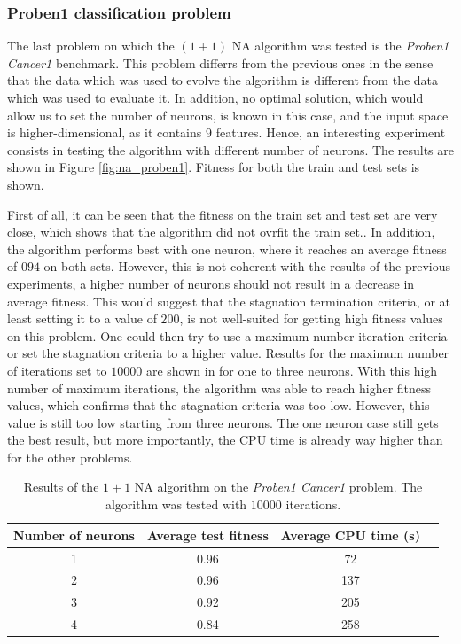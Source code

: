 \subsubsection{Proben1 classification problem}

The last problem on which the $(1 + 1)$ NA algorithm was tested is the \textit{Proben1 Cancer1} benchmark. This problem differrs from the previous ones in the sense that the data which
was used to evolve the algorithm is different from the data which was used to evaluate it. In addition, no optimal solution, which would allow us to set the number of neurons, is known in this case,
and the input space is higher-dimensional, as it contains $9$ features. Hence, an interesting experiment consists in testing the algorithm with different number of neurons.
The results are shown in Figure \ref{fig:na_proben1}. Fitness for both the train and test sets is shown.

First of all, it can be seen that the fitness on the train set and test set are very close, which shows that the algorithm did not ovrfit the train set.. In addition, the algorithm performs
best with one neuron, where it reaches an average fitness of $094$ on both sets. However, this is not coherent with the results of the previous experiments, a higher number of neurons should
not result in a decrease in average fitness. This would suggest that the stagnation termination criteria, or at least setting it to a value of $200$, is not well-suited for getting high fitness values
on this problem. One could then try to use a maximum number iteration criteria or set the stagnation criteria to a higher value. Results for the maximum number of iterations set to $10000$ are shown in
 for one to three neurons. With this high number of maximum iterations, the algorithm was able to reach higher fitness values, which confirms that the stagnation criteria was too low.
However, this value is still too low starting from three neurons. The one neuron case still gets the best result, but more importantly, the CPU time is already way higher than for the other problems.

\begin{table}
    \caption{Results of the $1 + 1$ NA algorithm on the \textit{Proben1 Cancer1} problem. The algorithm was tested with $10000$ iterations.}
    \centering
    \label{tab:na_proben1}
    \begin{tabular}{ |c|c|c|c| }
        \hline
        Number of neurons & Average test fitness & Average CPU time (s) \\
        \hline
        1 & 0.96 & 72 \\
        \hline
        2 & 0.96 & 137 \\
        \hline
        3 & 0.92 & 205 \\
        \hline
        4 & 0.84 & 258 \\
        \hline\hline
    \end{tabular}
\end{table}

